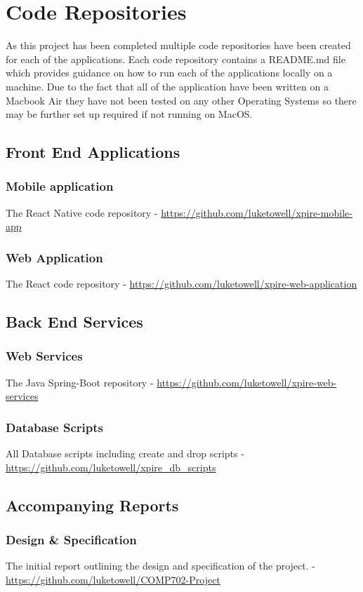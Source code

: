 \documentclass[a4paper,11pt]{report}
\begin{document}
\chapter*{Code Repositories}
As this project has been completed multiple code repositories have been created for each of the applications.
Each code repository contains a README.md file which provides guidance on how to run each of the applications locally on a machine. Due to the fact that all of the application have been written on a Macbook Air they have not been tested on any other Operating Systems so there may be further set up required if not running on MacOS.

\section*{Front End Applications}
\subsection*{Mobile application}
The React Native code repository - \url{https://github.com/luketowell/xpire-mobile-app}
\subsection*{Web Application}
The React code repository - \url{https://github.com/luketowell/xpire-web-application}

\section*{Back End Services}
\subsection*{Web Services}
The Java Spring-Boot repository - \url{https://github.com/luketowell/xpire-web-services}
\subsection*{Database Scripts}
All Database scripts including create and drop scripts - \url{https://github.com/luketowell/xpire_db_scripts}

\section*{Accompanying Reports}
\subsection*{Design \& Specification}
The initial report outlining the design and specification of the project. - \url{https://github.com/luketowell/COMP702-Project}
\end{document}
